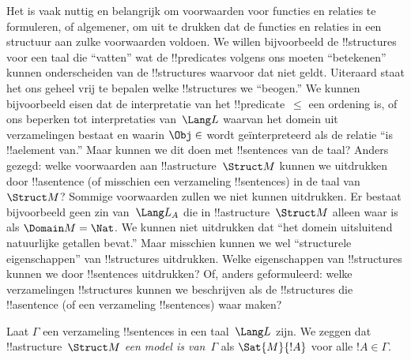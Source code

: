 \documentclass[../../../include/open-logic-section]{subfiles}
\begin{document}


\begin{explain}
Het is vaak nuttig en belangrijk om voorwaarden voor functies en
relaties te formuleren, of algemener, om uit te drukken dat de functies
en relaties in een structuur aan zulke voorwaarden voldoen. We willen
bijvoorbeeld de !!{structure}s voor een taal die ``vatten'' wat de
!!{predicate}s volgens ons moeten ``betekenen'' kunnen onderscheiden
van de !!{structure}s waarvoor dat niet geldt. Uiteraard staat het ons
geheel vrij te bepalen welke !!{structure}s we ``beogen.'' We kunnen
bijvoorbeeld eisen dat de interpretatie van het !!{predicate}~$\le$
een ordening is, of ons beperken tot interpretaties van~$\Lang L$
waarvan het domein uit verzamelingen bestaat en waarin $\Obj \in$ wordt
geïnterpreteerd als de relatie ``is !!a{element} van.'' Maar kunnen we
dit doen met !!{sentence}s van de taal? Anders gezegd: welke
voorwaarden aan !!a{structure}~$\Struct M$ kunnen we uitdrukken door
!!a{sentence} (of misschien een verzameling !!{sentence}s) in de taal
van~$\Struct M$? Sommige voorwaarden zullen we niet kunnen uitdrukken.
Er bestaat bijvoorbeeld geen zin van~$\Lang L_A$ die in
!!a{structure}~$\Struct M$ alleen waar is als $\Domain M = \Nat$. We
kunnen niet uitdrukken dat ``het domein uitsluitend natuurlijke
getallen bevat.'' Maar misschien kunnen we wel ``structurele
eigenschappen'' van !!{structure}s uitdrukken. Welke eigenschappen van
!!{structure}s kunnen we door !!{sentence}s uitdrukken? Of, anders
geformuleerd: welke verzamelingen !!{structure}s kunnen we beschrijven
als de !!{structure}s die !!a{sentence} (of een verzameling
!!{sentence}s) waar maken?
\end{explain}

\begin{defn}
Laat $\Gamma$ een verzameling !!{sentence}s in een taal~$\Lang L$ zijn.
We zeggen dat !!a{structure}~$\Struct M$ \emph{een model is van}~$\Gamma$
als $\Sat{M}{!A}$ voor alle $!A \in \Gamma$.
\end{defn}
\end{document}
